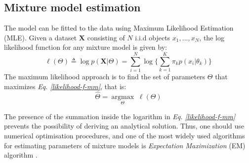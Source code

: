 \subsection{Mixture model estimation} \label{mixt-model-estimation-l-subsect}
The model can be fitted to the data using Maximum Likelihood Estimation (MLE). Given a dataset $\mathbf{X}$ consisting of $N$ i.i.d objects $x_{1}, ..., x_{N}$, the log likelihood function for any mixture model is given by:
\begin{equation} \label{likelihood-f-mm}
	\ell(\Theta) \triangleq \log p(\mathbf{X}|\Theta) = \sum_{i=1}^{N} \log \bigg\lbrace \sum_{k=1}^{K}\pi_{k}p(x_{i}|\theta_{k})\bigg\rbrace
\end{equation}
The maximum likelihood approach is to find the set of parameters $\Theta$ that maximizes \emph{Eq. \ref{likelihood-f-mm}}, that is:
\begin{equation} \label{MLE-f-mm}
	\hat{\Theta} =  \underset{\Theta}{\operatorname{argmax}} \; \ell(\Theta)
\end{equation}

The presence of the summation inside the logarithm in \emph{Eq. \ref{likelihood-f-mm}} prevents the possibility of deriving an analytical solution. Thus, one should use numerical optimisation procedures, and one of the most widely used algorithms for estimating parameters of mixture models is \emph{Expectation Maximization} (EM) algorithm \citep{Dempster1977}. 